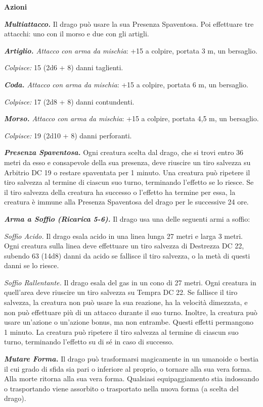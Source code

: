 \begin{multicols}{2}
\textbf{Azioni}

\emph{\textbf{Multiattacco.}} Il drago può usare la sua Presenza
Spaventosa. Poi effettuare tre attacchi: uno con il morso e due con gli
artigli.

\emph{\textbf{Artiglio.} Attacco con arma da mischia}: +15 a colpire,
portata 3 m, un bersaglio.

\emph{Colpisce:} 15 (2d6 + 8) danni taglienti.

\emph{\textbf{Coda.} Attacco con arma da mischia}: +15 a colpire,
portata 6 m, un bersaglio.

\emph{Colpisce:} 17 (2d8 + 8) danni contundenti.

\emph{\textbf{Morso.} Attacco con arma da mischia}: +15 a colpire,
portata 4,5 m, un bersaglio.

\emph{Colpisce:} 19 (2d10 + 8) danni perforanti.

\emph{\textbf{Presenza Spaventosa.}} Ogni creatura scelta dal drago, che
si trovi entro 36 metri da esso e consapevole della sua presenza, deve
riuscire un tiro salvezza su Arbitrio DC 19 o restare spaventata per 1
minuto. Una creatura può ripetere il tiro salvezza al termine di ciascun
suo turno, terminando l'effetto se lo riesce. Se il tiro salvezza della
creatura ha successo o l'effetto ha termine per essa, la creatura è
immune alla Presenza Spaventosa del drago per le successive 24 ore.

\emph{\textbf{Arma a Soffio (Ricarica 5-6).}} Il drago usa una delle
seguenti armi a soffio:

\emph{Soffio Acido.} Il drago esala acido in una linea lunga 27 metri e
larga 3 metri. Ogni creatura sulla linea deve effettuare un tiro
salvezza di Destrezza DC 22, subendo 63 (14d8) danni da acido se
fallisce il tiro salvezza, o la metà di questi danni se lo riesce.

\emph{Soffio Rallentante.} Il drago esala del gas in un cono di 27
metri. Ogni creatura in quell'area deve riuscire un tiro salvezza su Tempra DC 22. Se fallisce il tiro salvezza, la creatura non può
usare la sua reazione, ha la velocità dimezzata, e non può effettuare
più di un attacco durante il suo turno. Inoltre, la creatura può usare
un'azione o un'azione bonus, ma non entrambe. Questi effetti permangono
1 minuto. La creatura può ripetere il tiro salvezza al termine di
ciascun suo turno, terminando l'effetto su di sé in caso di successo.

\emph{\textbf{Mutare Forma.}} Il drago può trasformarsi magicamente in
un umanoide o bestia il cui grado di sfida sia pari o inferiore al
proprio, o tornare alla sua vera forma. Alla morte ritorna alla sua vera
forma. Qualsiasi equipaggiamento stia indossando o trasportando viene
assorbito o trasportato nella nuova forma (a scelta del drago).


\end{multicols}
